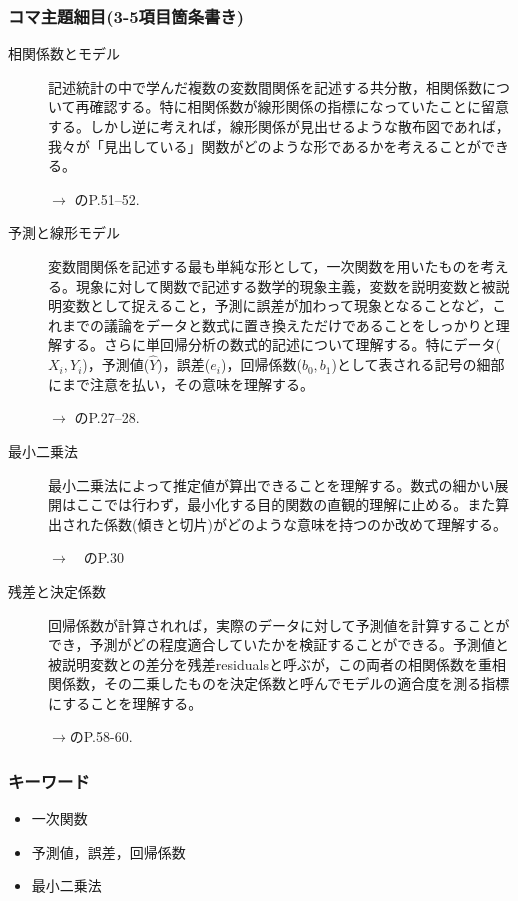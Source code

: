 \subsubsection{コマ主題細目(3-5項目箇条書き)}
\begin{description}
\item[相関係数とモデル]記述統計の中で学んだ複数の変数間関係を記述する共分散，相関係数について再確認する。特に相関係数が線形関係の指標になっていたことに留意する。しかし逆に考えれば，線形関係が見出せるような散布図であれば，我々が「見出している」関数がどのような形であるかを考えることができる。
\begin{flushright}
    $\to$ \citet{kosugi2018}のP.51--52.
\end{flushright}

\item[予測と線形モデル]変数間関係を記述する最も単純な形として，一次関数を用いたものを考える。現象に対して関数で記述する数学的現象主義，変数を説明変数と被説明変数として捉えること，予測に誤差が加わって現象となることなど，これまでの議論をデータと数式に置き換えただけであることをしっかりと理解する。さらに単回帰分析の数式的記述について理解する。特にデータ($X_i,Y_i$)，予測値($\hat{Y}$)，誤差($e_i$)，回帰係数($b_0,b_1$)として表される記号の細部にまで注意を払い，その意味を理解する。
\begin{flushright}
    $\to$ \citet{豊田201706}のP.27--28.
\end{flushright}

\item[最小二乗法]最小二乗法によって推定値が算出できることを理解する。数式の細かい展開はここでは行わず，最小化する目的関数の直観的理解に止める。また算出された係数(傾きと切片)がどのような意味を持つのか改めて理解する。
\begin{flushright}
    $\to$　\citet{豊田201706}のP.30
\end{flushright}

\item[残差と決定係数]回帰係数が計算されれば，実際のデータに対して予測値を計算することができ，予測がどの程度適合していたかを検証することができる。予測値と被説明変数との差分を残差residualsと呼ぶが，この両者の相関係数を重相関係数，その二乗したものを決定係数と呼んでモデルの適合度を測る指標にすることを理解する。
\begin{flushright}
    $\to$\citet{野島201903}のP.58-60.
\end{flushright}

\end{description}
\subsubsection{キーワード}
\begin{itemize}
\item 一次関数
\item 予測値，誤差，回帰係数
\item 最小二乗法
\end{itemize}
